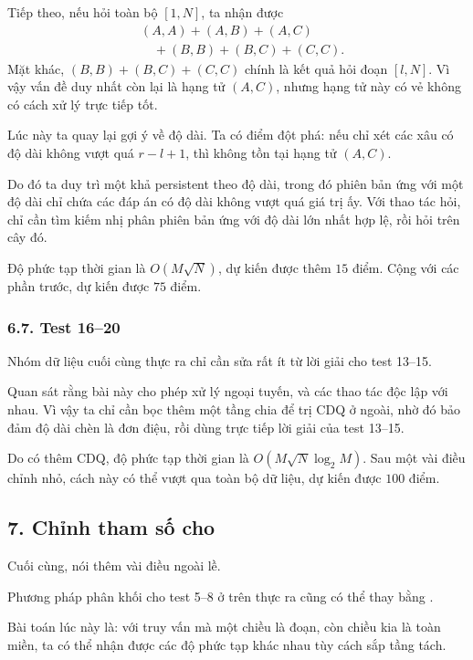 \documentclass[11pt]{article}
\begin{document}
Tiếp theo, nếu hỏi toàn bộ \([1,N]\), ta nhận được
\[
\begin{aligned}
 &(A,A)+(A,B)+(A,C)\\
 &\quad +(B,B)+(B,C)+(C,C).
\end{aligned}
\]
Mặt khác, \((B,B)+(B,C)+(C,C)\) chính là kết quả hỏi đoạn \([l,N]\). Vì vậy
vấn đề duy nhất còn lại là hạng tử \((A,C)\), nhưng hạng tử này có vẻ không
có cách xử lý trực tiếp tốt.

Lúc này ta quay lại gợi ý về độ dài. Ta có điểm đột phá: nếu chỉ xét các xâu
có độ dài không vượt quá \(r-l+1\), thì không tồn tại hạng tử \((A,C)\).

Do đó ta duy trì một  khả persistent theo độ dài, trong đó phiên
bản ứng với một độ dài chỉ chứa các đáp án có độ dài không vượt quá giá trị
ấy. Với thao tác hỏi, chỉ cần tìm kiếm nhị phân phiên bản  ứng
với độ dài lớn nhất hợp lệ, rồi hỏi trên cây đó.

Độ phức tạp thời gian là \(O(M\sqrt N)\), dự kiến được thêm \(15\) điểm. Cộng
với các phần trước, dự kiến được \(75\) điểm.

\subsubsection*{6.7. Test 16--20}

Nhóm dữ liệu cuối cùng thực ra chỉ cần sửa rất ít từ lời giải cho test
13--15.

Quan sát rằng bài này cho phép xử lý ngoại tuyến, và các thao tác độc lập với
nhau. Vì vậy ta chỉ cần bọc thêm một tầng chia để trị CDQ ở ngoài, nhờ đó bảo
đảm độ dài chèn là đơn điệu, rồi dùng trực tiếp lời giải của test 13--15.

Do có thêm CDQ, độ phức tạp thời gian là \(O(M\sqrt N\log_2 M)\). Sau một vài
điều chỉnh nhỏ, cách này có thể vượt qua toàn bộ dữ liệu, dự kiến được
\(100\) điểm.

\subsection*{7. Chỉnh tham số cho }

Cuối cùng, nói thêm vài điều ngoài lề.

Phương pháp phân khối cho test 5--8 ở trên thực ra cũng có thể thay bằng
.

Bài toán lúc này là: với truy vấn mà một chiều là đoạn, còn chiều kia là toàn
miền, ta có thể nhận được các độ phức tạp khác nhau tùy cách sắp tầng tách.
\end{document}
